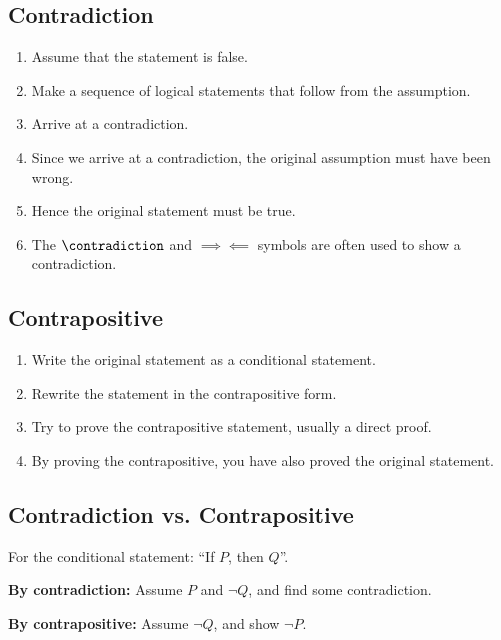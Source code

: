 \documentclass{article}
\begin{document}
\subsection{Contradiction}
\begin{enumerate}
    \item Assume that the statement is false.
    \item Make a sequence of logical statements that follow from the assumption.
    \item Arrive at a contradiction.
    \item Since we arrive at a contradiction, the original assumption must have been wrong.
    \item Hence the original statement must be true.
    \item The \(\contradiction\) and \(\implies\!\!\!\!\impliedby\) symbols
          are often used to show a contradiction.
\end{enumerate}
%
\subsection{Contrapositive}
\begin{enumerate}
    \item Write the original statement as a conditional statement.
    \item Rewrite the statement in the contrapositive form.
    \item Try to prove the contrapositive statement, usually a direct proof.
    \item By proving the contrapositive, you have also proved the original statement.
\end{enumerate}
%
\subsection{Contradiction vs. Contrapositive}
For the conditional statement: ``If \(P\), then \(Q\)''.

\textbf{By contradiction:} Assume \(P\) and \(\neg{Q}\), and find some contradiction.

\textbf{By contrapositive:} Assume \(\neg{Q}\), and show \(\neg{P}\).
%
\end{document}
